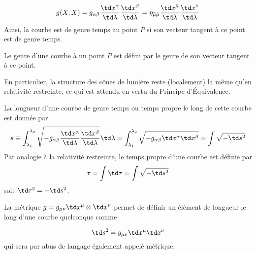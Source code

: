 \begin{equation}
   g(X, X) = g_{\alpha \beta}\frac{\td x^{\alpha}}{\td \lambda}\frac{\td x^{\beta}}{\td \lambda} = \eta_{\hat{\mu} \hat{\mu}}\frac{\td x^{\hat{\mu}}}{\td \lambda}\frac{\td x^{\hat{\nu}}}{\td \lambda}
\end{equation}
Ainsi, la courbe est de genre temps au point $P$ si son vecteur tangent à ce point est de genre temps.
\begin{theoremframe}
    \begin{defi}
        Le genre d'une courbe à un point $P$ est défini par le genre de son vecteur tangent à ce point.
    \end{defi}
\end{theoremframe}
En particulier, la structure des cônes de lumière reste (localement) la même qu'en relativité restreinte, ce qui est attendu en vertu du Principe d'Équivalence.
\begin{theoremframe}
    \begin{defi}
        La longueur d'une courbe de genre temps ou temps propre le long de cette courbe est donnée par 
            \begin{equation}
            s \equiv \int^{\lambda_2}_{\lambda_{1}}\sqrt{-g_{\alpha \beta}\frac{\td x^{\alpha}}{\td\lambda}\frac{\td x^{\beta}}{\td \lambda}} \td\lambda = \int^{\lambda_2}_{\lambda_{1}}\sqrt{-g_{\alpha \beta}\td x^{\alpha}\td x^{\beta}} =  \int \sqrt{-\td s^2 }
            \end{equation}
        Par analogie à la relativité restreinte, le temps propre d'une courbe est définie par
        \begin{equation}
            \tau = \int \td \tau = \int \sqrt{-\td s^2 }
        \end{equation}
        soit $\td \tau^2 = - \td s^2$.
    \end{defi}
\end{theoremframe}

La métrique $g = g_{\mu \nu}\td x^{\mu}\otimes \td x^{\nu}$ permet de définir un élément de longueur le long d'une courbe quelconque comme

$$ \td s^2 = g_{\mu \nu}\td x^{\mu}\td x^{\nu}$$
qui sera par abus de langage également appelé métrique. 
